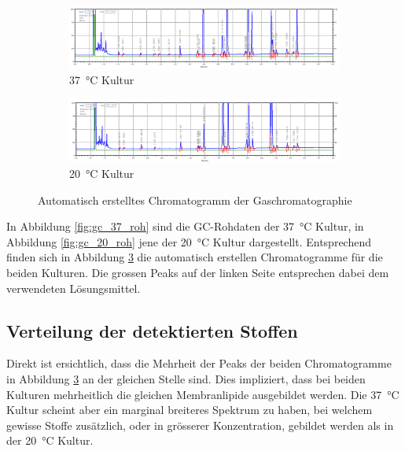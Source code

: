 \documentclass[a4paper,english]{scrreprt}
\begin{document}
\begin{figure}
	\centering
	\begin{subfigure}{\textwidth}
		\includegraphics[width=\linewidth]{img/gc_37_chromatogramm.png}
		\caption{\SI{37}{\celsius} Kultur}
		\label{fig:gc_37_chromatogramm}
	\end{subfigure}
	\begin{subfigure}{\textwidth}
		\includegraphics[width=\linewidth]{img/gc_20_chromatogramm.png}
		\caption{\SI{20}{\celsius} Kultur}
		\label{fig:gc_20_chromatogramm}
	\end{subfigure}
	\caption{Automatisch erstelltes Chromatogramm der Gaschromatographie}
	\label{fig:gc_chromatogramm}
\end{figure}


In Abbildung \ref{fig:gc_37_roh} sind die GC-Rohdaten der \SI{37}{\celsius}
Kultur, in Abbildung \ref{fig:gc_20_roh} jene der \SI{20}{\celsius} Kultur
dargestellt. Entsprechend finden sich in Abbildung \ref{fig:gc_chromatogramm}
die automatisch erstellen Chromatogramme für die beiden Kulturen. Die grossen
Peaks auf der linken Seite entsprechen dabei dem verwendeten Lösungsmittel.

\subsection{Verteilung der detektierten Stoffen}

Direkt ist ersichtlich, dass die Mehrheit der Peaks der beiden Chromatogramme in
Abbildung \ref{fig:gc_chromatogramm} an der gleichen Stelle sind. Dies
impliziert, dass bei beiden Kulturen mehrheitlich die gleichen Membranlipide
ausgebildet werden. Die \SI{37}{\celsius} Kultur scheint aber ein marginal
breiteres Spektrum zu haben, bei welchem gewisse Stoffe zusätzlich, oder in
grösserer Konzentration, gebildet werden als in der \SI{20}{\celsius} Kultur.
\end{document}
